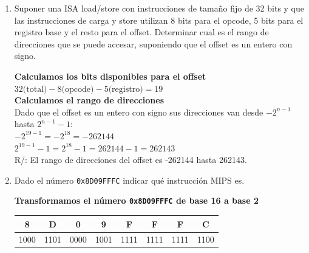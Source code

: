 \documentclass[a4paper, 11pt]{article}
\newcommand{\Pspace}{0.5cm}
\newcommand{\Aspace}{0.2cm}
\begin{document}
\begin{enumerate}
    \vspace{\Pspace}
    \item Suponer una ISA load/store con instrucciones de tamaño fijo de 32 bits y que las instrucciones de carga y store utilizan 8 bits para el opcode, 5 bits para el registro base y el resto para el offset. Determinar cual es el rango de direcciones que se puede accesar, suponiendo que el offset es un entero con signo. \par
        \vspace{\Aspace} \par
        { \color{azul}  
            \textbf{Calculamos los bits disponibles para el offset} \\
            $32 \text{(total)} - 8 \text{(opcode)} - 5 \text{(registro)} = 19$ \\
    
            \textbf{Calculamos el rango de direcciones} \\
            Dado que el offset es un entero con signo sus direcciones van desde $-2^{n-1}$ hasta $2^{n-1} - 1$: \\
            $-2^{19-1} = -2^{18} = -262144$ \\
            $2^{19-1} - 1 = 2^{18} - 1 = 262144 - 1 = 262143$ \\
            R/: El rango de direcciones del offset es -262144 hasta 262143.
        }



    \vspace{\Pspace}
    \item Dado el número \texttt{0x8D09FFFC} indicar qué instrucción MIPS es. \par
        \vspace{\Aspace}
        { \color{azul}  
            \textbf{Transformamos el número \texttt{0x8D09FFFC} de base 16 a base 2} \\ 
            \begin{tabular}{|c|c|c|c|c|c|c|c|}
                \hline
                \textbf{8} & \textbf{D} & \textbf{0} & \textbf{9} & \textbf{F} & \textbf{F} & \textbf{F} & \textbf{C} \\
                \hline
                1000 & 1101 & 0000 & 1001 & 1111 & 1111 & 1111 & 1100 \\
                \hline
            \end{tabular} \\

}
\end{enumerate}
\end{document}
